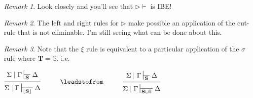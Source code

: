 \documentclass{article}                     %
\theoremstyle{theorem}
\theoremstyle{corollary}
\theoremstyle{lemma}
\theoremstyle{definition}
\theoremstyle{remark}
\newtheorem{remark}{Remark}
\theoremstyle{definition}
\theoremstyle{notation}
\theoremstyle{definition}
\theoremstyle{proposition}
\theoremstyle{definition}
\begin{document}
\begin{remark}
Look closely and you'll see that $\rhd\vdash $ is IBE! 
\end{remark}

\begin{remark}
 The left and right rules for $ \rhd $ make possible an application of the cut-rule that is not eliminable. I'm still seeing what can be done about this.
\end{remark}


\begin{remark}

 Note that the $ \xi $ rule is equivalent to a particular application of the $ \sigma $ rule where $ \mathbf{T} = \mathbb{S} $, i.e.
 
 \vspace{3mm}
 
 $
 \begin{prooftree}
 	\Hypo{\Sigma\mid\Gamma\sststile{\mathbf{S}}{}\Delta}
 	\Infer1[]{ \Sigma\mid\Gamma\sststile{\lfloor\mathbf{S}\rfloor}{} \Delta}
 \end{prooftree}
 \hspace{1cm} \leadstofrom \hspace{1cm}
 \begin{prooftree}
 	\Hypo{\Sigma\mid\Gamma\sststile{\mathbf{S}}{}\Delta}
 	\Infer1[]{ \Sigma\mid\Gamma\sststile{\mathbf{S}\cup\mathbb{S}}{} \Delta}
 \end{prooftree}
 $
\end{remark}

 \vspace{3mm}

\end{document}
